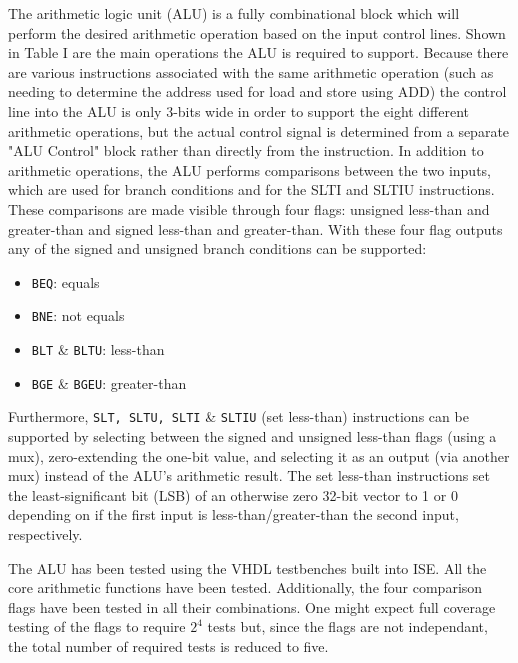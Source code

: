 \documentclass[lettersize,journal]{IEEEtran}
\begin{document}
The arithmetic logic unit (ALU) is a fully combinational block which will perform the desired arithmetic operation based on the input control lines.
Shown in Table I are the main operations the ALU is required to support. Because there are various instructions associated with the same
arithmetic operation (such as needing to determine the address used for load and store using ADD) the control line into the ALU is only 3-bits wide in order to support
the eight different arithmetic operations, but the actual control signal is determined from a separate "ALU Control" block rather than directly from the instruction.
In addition to arithmetic operations, the ALU performs comparisons between the two inputs, which are used for branch conditions and for the SLTI and SLTIU instructions.
These comparisons are made visible through four flags: unsigned less-than and greater-than and signed less-than and greater-than.
With these four flag outputs any of the signed and unsigned branch conditions can be supported:
\begin{itemize}
    \item \verb|BEQ|: equals
    \item \verb|BNE|: not equals
    \item \verb|BLT| \& \verb|BLTU|: less-than
    \item \verb|BGE| \& \verb|BGEU|: greater-than
\end{itemize}

Furthermore, \verb|SLT, SLTU, SLTI| \& \verb|SLTIU| (set less-than) instructions can be supported by selecting between the signed and unsigned less-than flags (using a mux), zero-extending the one-bit value, and selecting it as an output (via another mux) instead of the ALU's arithmetic result.
The set less-than instructions set the least-significant bit (LSB) of an otherwise zero 32-bit vector to 1 or 0 depending on if the first input is less-than/greater-than the second input, respectively.

The ALU has been tested using the VHDL testbenches built into ISE.
All the core arithmetic functions have been tested.
Additionally, the four comparison flags have been tested in all their combinations.
One might expect full coverage testing of the flags to require $2^{4}$ tests but, since the flags are not independant, the total number of required tests is reduced to five.
\end{document}
